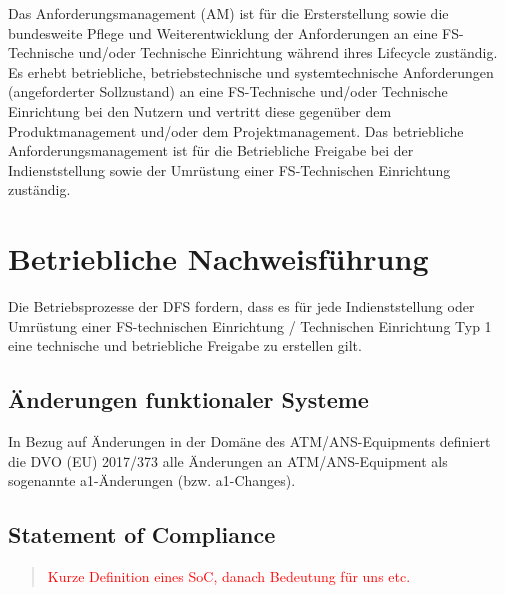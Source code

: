 Das Anforderungsmanagement (AM) ist für die Ersterstellung sowie die bundesweite Pflege und Weiterentwicklung der Anforderungen an eine FS-Technische und/oder Technische Einrichtung während ihres Lifecycle zuständig. Es erhebt betriebliche, betriebstechnische und systemtechnische Anforderungen (angeforderter Sollzustand) an eine FS-Technische und/oder Technische Einrichtung bei den Nutzern und vertritt diese gegenüber dem Produktmanagement und/oder dem Projektmanagement. Das betriebliche Anforderungsmanagement ist für die Betriebliche Freigabe bei der Indienststellung sowie der Umrüstung einer FS-Technischen Einrichtung zuständig. 


    \pagebreak
    \section{Betriebliche Nachweisführung}

Die Betriebsprozesse der \ac{DFS} fordern, dass es für jede Indienststellung oder Umrüstung einer FS-technischen Einrichtung / Technischen Einrichtung Typ 1 eine technische und betriebliche Freigabe zu erstellen gilt. \cite{fa_freigaben}

\subsection{Änderungen funktionaler Systeme}

In Bezug auf Änderungen in der Domäne des ATM/ANS-Equipments definiert die DVO (EU) 2017/373 alle Änderungen an ATM/ANS-Equipment als sogenannte a1-Änderungen (bzw. a1-Changes).




        \pagebreak
        \subsection{Statement of Compliance}

        \begin{quote}
\textcolor{red}{Kurze Definition eines SoC, danach Bedeutung für uns etc.}
\end{quote}

        \pagebreak
